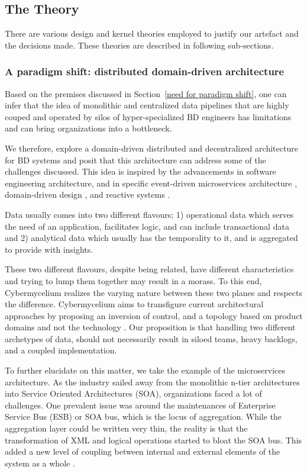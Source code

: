 \documentclass[review]{elsarticle}
\begin{document}
\subsection{The Theory}

There are various design and kernel theories employed to justify our artefact and the decisions made. These theories are described in following sub-sections.

\subsubsection{A paradigm shift: distributed domain-driven architecture}

Based on the premises discussed in Section~\ref{need for paradigm shift}, one can infer that the idea of monolithic and centralized data pipelines that are highly couped and operated by silos of hyper-specialized BD engineers has limitations and can bring organizations into a bottleneck.

We therefore, explore a domain-driven distributed and decentralized architecture for BD systems and posit that this architecture can address some of the challenges discussed. This idea is inspired by the advancements in software engineering architecture, and in specific event-driven microservices architecture \cite{EventDrivenMicroServices}, domain-driven design \cite{evans2004domain}, and reactive systems \cite{aceto2007reactive}.

Data usually comes into two different flavours; 1) operational data which serves the need of an application, facilitates logic, and can include transactional data and 2) analytical data which usually has the temporality to it, and is aggregated to provide with insights.

These two different flavours, despite being related, have different characteristics and trying to lump them together may result in a morass. To this end, Cybermycelium realizes the varying nature between these two planes and respects the difference. Cybermycelium aims to transfigure current architectural approaches by proposing an inversion of control, and a topology based on product domains and not the technology \cite{dataMeshArticle}. Our proposition is that handling two different archetypes of data, should not necessarily result in siloed teams, heavy backlogs, and a coupled implementation.

To further elucidate on this matter, we take the example of the microservices architecture. As the industry sailed away from the monolithic n-tier architectures into Service Oriented Architectures (SOA), organizations faced a lot of challenges. One prevalent issue was around the maintenances of Enterprise Service Bus (ESB) or SOA bus, which is the locus of aggregation. While the aggregation layer could be written very thin, the reality is that the transformation of XML and logical operations started to bloat the SOA bus. This added a new level of coupling between internal and external elements of the system as a whole \cite{di2017architecting,zimmermann2017microservices,waseem2020systematic}.
\end{document}
